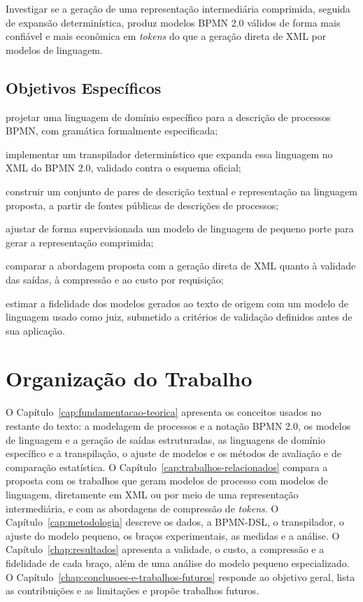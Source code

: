 Investigar se a geração de uma representação intermediária comprimida, seguida de expansão determinística, produz modelos BPMN 2.0 válidos de forma mais confiável e mais econômica em \textit{tokens} do que a geração direta de XML por modelos de linguagem.

\subsection{Objetivos Específicos}
\label{sec:objetivos-especificos}

	\begin{alineas}
		\item projetar uma linguagem de domínio específico para a descrição de processos BPMN, com gramática formalmente especificada;
		\item implementar um transpilador determinístico que expanda essa linguagem no XML do BPMN 2.0, validado contra o esquema oficial;
		\item construir um conjunto de pares de descrição textual e representação na linguagem proposta, a partir de fontes públicas de descrições de processos;
		\item ajustar de forma supervisionada um modelo de linguagem de pequeno porte para gerar a representação comprimida;
		\item comparar a abordagem proposta com a geração direta de XML quanto à validade das saídas, à compressão e ao custo por requisição;
		\item estimar a fidelidade dos modelos gerados ao texto de origem com um modelo de linguagem usado como juiz, submetido a critérios de validação definidos antes de sua aplicação.
	\end{alineas}

\section{Organização do Trabalho}
\label{sec:organizacao}

O Capítulo~\ref{cap:fundamentacao-teorica} apresenta os conceitos usados no restante do texto: a modelagem de processos e a notação BPMN 2.0, os modelos de linguagem e a geração de saídas estruturadas, as linguagens de domínio específico e a transpilação, o ajuste de modelos e os métodos de avaliação e de comparação estatística. O Capítulo~\ref{cap:trabalhos-relacionados} compara a proposta com os trabalhos que geram modelos de processo com modelos de linguagem, diretamente em XML ou por meio de uma representação intermediária, e com as abordagens de compressão de \textit{tokens}. O Capítulo~\ref{cap:metodologia} descreve os dados, a BPMN-DSL, o transpilador, o ajuste do modelo pequeno, os braços experimentais, as medidas e a análise. O Capítulo~\ref{chap:resultados} apresenta a validade, o custo, a compressão e a fidelidade de cada braço, além de uma análise do modelo pequeno especializado. O Capítulo~\ref{chap:conclusoes-e-trabalhos-futuros} responde ao objetivo geral, lista as contribuições e as limitações e propõe trabalhos futuros.
